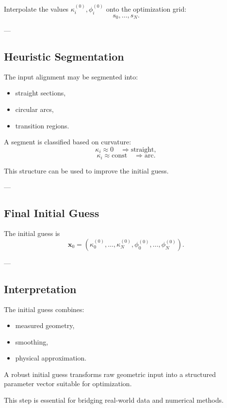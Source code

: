 \begin{definition}
Interpolate the values \(\kappa_i^{(0)},\phi_i^{(0)}\)
onto the optimization grid:
\[
s_0,\dots,s_N.
\]
\end{definition}

---

\subsection{Heuristic Segmentation}

\begin{remark}
The input alignment may be segmented into:
\begin{itemize}
\item straight sections,
\item circular arcs,
\item transition regions.
\end{itemize}
\end{remark}

\begin{definition}
A segment is classified based on curvature:
\[
\kappa_i \approx 0 \quad \Rightarrow \text{straight},
\]
\[
\kappa_i \approx \text{const} \quad \Rightarrow \text{arc}.
\]
\end{definition}

\begin{remark}
This structure can be used to improve the initial guess.
\end{remark}

---

\subsection{Final Initial Guess}

\begin{definition}
The initial guess is
\[
\mathbf{x}_0 =
(\kappa_0^{(0)},\dots,\kappa_N^{(0)},
\phi_0^{(0)},\dots,\phi_N^{(0)}).
\]
\end{definition}

---

\subsection{Interpretation}

\begin{remark}
The initial guess combines:
\begin{itemize}
\item measured geometry,
\item smoothing,
\item physical approximation.
\end{itemize}
\end{remark}

\begin{summary}
A robust initial guess transforms raw geometric input into a structured
parameter vector suitable for optimization.

This step is essential for bridging real-world data and numerical
methods.
\end{summary}
